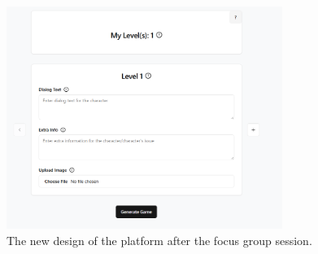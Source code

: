 \begin{figure}
    \centering
    \includegraphics[width=0.8\textwidth]{figures/Diagnose_Game/Instructor_Portal_Diagnose_Game.png}
    \caption{The new design of the platform after the focus group session.}
    \label{fig:design}
\end{figure}


